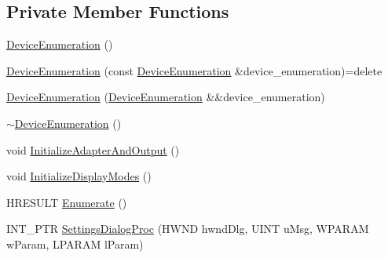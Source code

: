 \subsection*{Private Member Functions}
\begin{DoxyCompactItemize}
\item 
\hyperlink{classmage_1_1_device_enumeration_aa000048648beb6c2aca70e5ef04e0da2}{Device\+Enumeration} ()
\item 
\hyperlink{classmage_1_1_device_enumeration_a90f3dc13cfb413aa8a2a49a31bcb6ae3}{Device\+Enumeration} (const \hyperlink{classmage_1_1_device_enumeration}{Device\+Enumeration} \&device\+\_\+enumeration)=delete
\item 
\hyperlink{classmage_1_1_device_enumeration_a99cb1ad03813e68872e97a04c6388bc2}{Device\+Enumeration} (\hyperlink{classmage_1_1_device_enumeration}{Device\+Enumeration} \&\&device\+\_\+enumeration)
\item 
\hyperlink{classmage_1_1_device_enumeration_a6a8cfc259c1e8c98ba0a9780c42a5ffe}{$\sim$\+Device\+Enumeration} ()
\item 
void \hyperlink{classmage_1_1_device_enumeration_acbedeeb225585dc240f8f5be83ac5989}{Initialize\+Adapter\+And\+Output} ()
\item 
void \hyperlink{classmage_1_1_device_enumeration_af6411210d27162b033afcb9693dec301}{Initialize\+Display\+Modes} ()
\item 
H\+R\+E\+S\+U\+LT \hyperlink{classmage_1_1_device_enumeration_a4fea0ffef733632456b281f74608a239}{Enumerate} ()
\item 
I\+N\+T\+\_\+\+P\+TR \hyperlink{classmage_1_1_device_enumeration_a5950a6575d9073d6d23b228779f5ace1}{Settings\+Dialog\+Proc} (H\+W\+ND hwnd\+Dlg, U\+I\+NT u\+Msg, W\+P\+A\+R\+AM w\+Param, L\+P\+A\+R\+AM l\+Param)
\end{DoxyCompactItemize}
